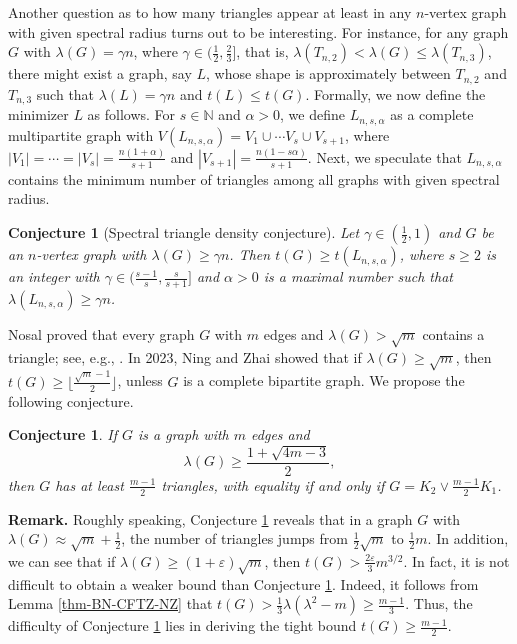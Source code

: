 \documentclass[11pt]{article}
\newtheorem{conjecture}[theorem]{Conjecture}
\begin{document}
\medskip 
Another question as to how many triangles appear at least in any $n$-vertex graph with given spectral radius turns out to be interesting.
For instance, for any graph $G$ with 
$\lambda (G)= \gamma n$, where $\gamma \in (\frac{1}{2}, \frac{2}{3}]$, that is, $\lambda (T_{n,2})<\lambda (G) \le \lambda (T_{n,3})$, 
  there might exist a graph, say $L$, whose shape is approximately between $T_{n,2}$ and $T_{n,3}$   
 such that $\lambda(L) = \gamma n$ and $t(L)\le t(G)$. 
Formally, we now define the minimizer $L$ as follows.  
For $s\in \mathbb{N}$ and $\alpha >0$, 
we define $L_{n,s,\alpha}$ as a complete multipartite graph with 
$V(L_{n,s,\alpha})=V_1 \cup \cdots V_s \cup V_{s+1}$, 
where $|V_1|=\cdots =|V_s|= \frac{n(1+ \alpha )}{s+1}$ and 
$|V_{s+1}|= \frac{n(1-s\alpha)}{s+1}$. 
Next, we speculate that $L_{n,s,\alpha}$ 
contains the minimum number of triangles 
among all graphs with given spectral radius. 


\begin{conjecture}[Spectral triangle density conjecture]
Let $\gamma \in (\frac{1}{2},1)$ 
and $G$ be an $n$-vertex graph with  $\lambda (G)\ge \gamma n$. 
Then $t(G)\ge t(L_{n,s,\alpha})$, where 
 $s\ge 2$ is an integer with 
$\gamma \in (\frac{s-1}{s},\frac{s}{s+1}]$ and 
 $\alpha>0 $ is a maximal number such that 
$\lambda (L_{n,s,\alpha}) \ge \gamma n$. 
\end{conjecture}


 Nosal \cite{Nosal1970}  
proved that every graph $G$ with
$m$ edges and $\lambda (G) > \sqrt{m}$ 
contains a triangle; see, e.g., \cite{Niki2002cpc,Ning2017-ars}. 
In 2023, Ning and Zhai \cite{NZ2021}
showed that if
$  \lambda (G)\ge \sqrt{m}$,
then $t(G) \ge \lfloor \frac{\sqrt{m}-1}{2} \rfloor$, unless $G$ is a  complete bipartite graph. 
We propose the following conjecture. 

\begin{conjecture} \label{conj-72}
If $G$ is a graph with $m$ edges and 
\[  \lambda (G)\ge \frac{1+\sqrt{4m-3}}{2}, \]  
then $G$ has at least $\frac{m-1}{2}$ triangles, 
with equality if and only if $G=K_2\vee \frac{m-1}{2}K_1$. 
\end{conjecture}


\noindent 
{\bf Remark.} 
Roughly speaking, Conjecture \ref{conj-72} reveals that 
in a graph $G$ with $\lambda (G) \approx \sqrt{m} + \frac{1}{2}$, 
the number of triangles 
jumps from $\frac{1}{2}\sqrt{m}$  
to $ \frac{1}{2}m$. 
In addition, we can see that if $\lambda (G)\ge (1+ \varepsilon)\sqrt{m}$, 
then $t(G)> \frac{2\varepsilon}{3}m^{3/2}$. 
In fact, it is not difficult to obtain a weaker bound than Conjecture \ref{conj-72}. Indeed, it follows from Lemma \ref{thm-BN-CFTZ-NZ} that 
$t(G)> \frac{1}{3}\lambda (\lambda^2-m) \ge \frac{m-1}{3}$. 
Thus, the difficulty of Conjecture \ref{conj-72} lies in 
deriving the tight bound $t(G)\ge \frac{m-1}{2}$. 
\end{document}
